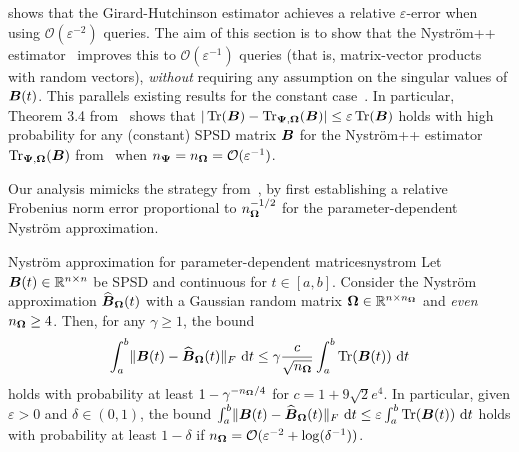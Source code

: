  shows that the Girard-Hutchinson estimator achieves a relative $\varepsilon$-error when using $\mathcal{O}(\varepsilon^{-2})$ queries. The aim of this section is to show that the Nyström++ estimator~ improves this to $\mathcal{O}(\varepsilon^{-1})$ queries (that is, matrix-vector products with random vectors), \emph{without} requiring any assumption on the singular values of $\boldsymbol{B}(t)$. This parallels existing results for the constant case~\cite{meyer-2021-hutch-optimal,persson-2022-improved-variants}. In particular, Theorem 3.4 from~\cite{persson-2022-improved-variants} shows that $|\operatorname{Tr}(\boldsymbol{B}) - \operatorname{Tr}_{\boldsymbol{\Psi}, \boldsymbol{\Omega}}(\boldsymbol{B})| \leq \varepsilon \operatorname{Tr}(\boldsymbol{B})$ holds with high probability for any (constant) SPSD matrix $\boldsymbol{B}$ for the Nyström++ estimator $\operatorname{Tr}_{\boldsymbol{\Psi}, \boldsymbol{\Omega}}(\boldsymbol{B})$ from~ when $n_{\boldsymbol{\Psi}} = n_{\boldsymbol{\Omega}} = \mathcal{O}(\varepsilon^{-1})$. 

Our analysis mimicks the strategy from~\cite{meyer-2021-hutch-optimal}, by first establishing a relative Frobenius norm error proportional to $n_{\boldsymbol{\Omega}}^{-1/2}$ for the parameter-dependent Nyström approximation.


\begin{lemma}{Nyström approximation for parameter-dependent matrices}{nystrom}
    Let $\boldsymbol{B}(t) \in \mathbb{R}^{n \times n}$ be SPSD and continuous for $t \in [a, b]$. Consider the Nyström approximation $\widehat{\boldsymbol{B}}_{\boldsymbol{\Omega}}(t)$ with a Gaussian random matrix $\boldsymbol{\Omega} \in \mathbb{R}^{n \times n_{\boldsymbol{\Omega}}}$ and \emph{even} $n_{\boldsymbol{\Omega}} \geq 4$.
    Then, for any $\gamma \geq 1$, the bound
    \begin{equation}
        \int_{a}^{b} \lVert \boldsymbol{B}(t) - \widehat{\boldsymbol{B}}_{\boldsymbol{\Omega}}(t) \rVert _F~\mathrm{d}t \leq \gamma \frac{c}{\sqrt{n_{\boldsymbol{\Omega}}}} \int_{a}^{b} \operatorname{Tr}(\boldsymbol{B}(t))~\mathrm{d}t
        \label{qu:nystrompp-theorem-bound}
    \end{equation}
        holds with probability at least $1 - \gamma^{-n_{\boldsymbol{\Omega}} / 4}$ for 
        $c = 1 + 9 \sqrt{2} e^4$. In particular, given $\varepsilon > 0$ and $\delta \in (0, 1)$, the bound $\int_{a}^{b} \lVert \boldsymbol{B}(t) - \widehat{\boldsymbol{B}}_{\boldsymbol{\Omega}}(t) \rVert _F~\mathrm{d}t \leq \varepsilon \int_{a}^{b} \operatorname{Tr}(\boldsymbol{B}(t))~\mathrm{d}t$ holds with probability at least $1-\delta$ if $n_{\boldsymbol{\Omega}} = \mathcal{O}(\varepsilon^{-2} + \log(\delta^{-1}))$.
\end{lemma}

